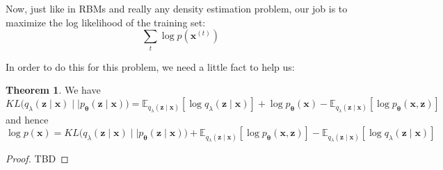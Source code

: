 \documentclass{article}
\theoremstyle{definition}
\newtheorem{theorem}{Theorem}[section]
\theoremstyle{remark}
\theoremstyle{definition}
\begin{document}
    Now, just like in RBMs and really any density estimation problem, our job is to maximize the log likelihood of the training set: 
    \[\sum_{t} \log p(\mathbf{x}^{(t)})\]

    In order to do this for this problem, we need a little fact to help us: 

    \begin{theorem}
    We have 
    \[KL \big( q_\lambda (\mathbf{z} \mid \mathbf{x}) \mid\mid p_{\boldsymbol{\theta}} (\mathbf{z} \mid \mathbf{x}) \big) = \mathbb{E}_{q_\lambda(\mathbf{z} \mid \mathbf{x})} [ \log q_{\lambda} (\mathbf{z} \mid \mathbf{x})] + \log p_{\boldsymbol{\theta}} (\mathbf{x}) - \mathbb{E}_{q_{\lambda} (\mathbf{z} \mid \mathbf{x})} [\log p_{\boldsymbol{\theta}} (\mathbf{x}, \mathbf{z})] \]
    and hence 
    \[\log p(\mathbf{x}) = KL \big( q_\lambda (\mathbf{z} \mid \mathbf{x}) \mid\mid p_{\boldsymbol{\theta}} (\mathbf{z} \mid \mathbf{x}) \big) + \mathbb{E}_{q_{\lambda} (\mathbf{z} \mid \mathbf{x})} [\log p_{\boldsymbol{\theta}} (\mathbf{x}, \mathbf{z})] - \mathbb{E}_{q_\lambda(\mathbf{z} \mid \mathbf{x})} [ \log q_{\lambda} (\mathbf{z} \mid \mathbf{x})]  \]
    \end{theorem}
    \begin{proof}
    TBD 
    \end{proof}
\end{document}
